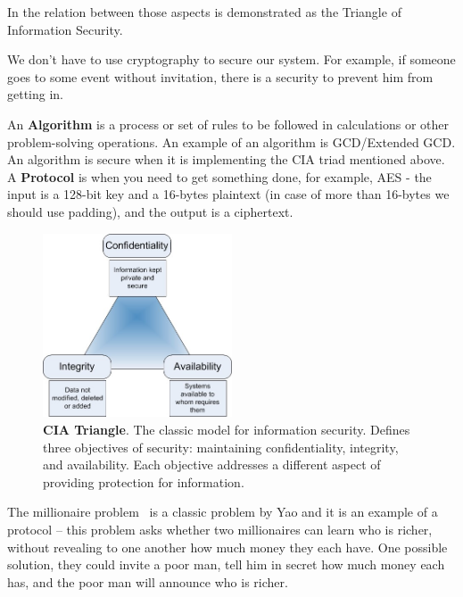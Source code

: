 In  the relation between those aspects is demonstrated as the Triangle of Information Security.

We don't have to use cryptography to secure our system. For example, if someone goes to some event without invitation, there is a security to prevent him from getting in.

An \textbf{Algorithm} is a process or set of rules to be followed in calculations or other problem-solving operations. An example of an algorithm is GCD/Extended GCD. An algorithm is secure when it is implementing the CIA triad mentioned above. A \textbf{Protocol} is when you need to get something done, for example, AES -  the input is a 128-bit key and a 16-bytes plaintext (in case of more than 16-bytes we should use padding), and the output is a ciphertext.

\begin{figure}
    \centering
    \includegraphics[width=0.5\textwidth]{images/ch1_Intro/cia.jpg}
    \caption{\textbf{CIA Triangle}. The classic model for information security. Defines three objectives of security: maintaining confidentiality, integrity, and availability. Each objective addresses a different aspect of providing protection for information.}
    \label{fig:CIA}
\end{figure}

The millionaire problem~\cite{lin2005efficient} is a classic problem by Yao and it is an example of a protocol – this problem asks whether two millionaires can learn who is richer, without revealing to one another how much money they each have. One possible solution, they could invite a poor man, tell him in secret how much money each has, and the poor man will announce who is richer.  

